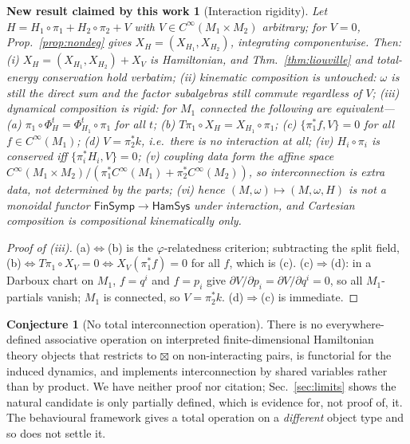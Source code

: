 \documentclass[12pt,a4paper]{article}
\theoremstyle{definition}
\newtheorem{conjecture}[definition]{Conjecture}
\theoremstyle{plain}
\theoremstyle{commentary}
\newtheorem{newresult}[definition]{New result claimed by this work}
\newcommand{\Cinf}{C^{\infty}}
\newcommand{\FinSymp}{\mathsf{FinSymp}}
\newcommand{\HamSys}{\mathsf{HamSys}}
\newcommand{\pb}[2]{\{#1,#2\}}
\begin{document}
\begin{newresult}[Interaction rigidity]\label{new:rigid}
Let $H=H_1\circ\pi_1+H_2\circ\pi_2+V$ with $V\in\Cinf(M_1\times M_2)$ arbitrary; for $V=0$,
Prop.~\ref{prop:nondeg} gives $X_H=(X_{H_1},X_{H_2})$, integrating componentwise. Then:
(i) $X_H=(X_{H_1},X_{H_2})+X_V$ is Hamiltonian, and Thm.~\ref{thm:liouville} and total-energy
conservation hold verbatim; (ii) \emph{kinematic composition is untouched}: $\omega$ is still the
direct sum and the factor subalgebras still commute \emph{regardless of $V$}; (iii) \emph{dynamical
composition is rigid}: for $M_1$ connected the following are equivalent---(a)
$\pi_1\circ\Phi^t_H=\Phi^t_{H_1}\circ\pi_1$ for all $t$; (b) $T\pi_1\circ X_H=X_{H_1}\circ\pi_1$;
(c) $\pb{\pi_1^*f}{V}=0$ for all $f\in\Cinf(M_1)$; (d) $V=\pi_2^*k$, i.e.\ \emph{there is no
interaction at all}; (iv) $H_i\circ\pi_i$ is conserved iff $\pb{\pi_i^*H_i}{V}=0$; (v) coupling data
form the affine space $\Cinf(M_1\times M_2)/(\pi_1^*\Cinf(M_1)+\pi_2^*\Cinf(M_2))$, so
\emph{interconnection is extra data, not determined by the parts}; (vi) hence
$(M,\omega)\mapsto(M,\omega,H)$ is \emph{not} a monoidal functor $\FinSymp\to\HamSys$ under
interaction, and Cartesian composition is compositional \emph{kinematically only}.
\end{newresult}
\begin{proof}[Proof of (iii)]
(a)$\Leftrightarrow$(b) is the $\varphi$-relatedness criterion; subtracting the split field,
(b)$\Leftrightarrow T\pi_1\circ X_V=0\Leftrightarrow X_V(\pi_1^*f)=0$ for all $f$, which is (c).
(c)$\Rightarrow$(d): in a Darboux chart on $M_1$, $f=q^i$ and $f=p_i$ give $\partial V/\partial
p_i=\partial V/\partial q^i=0$, so all $M_1$-partials vanish; $M_1$ is connected, so $V=\pi_2^*k$.
(d)$\Rightarrow$(c) is immediate.
\end{proof}


\begin{conjecture}[No total interconnection operation]\label{conj:interconnect}
There is no everywhere-defined associative operation on interpreted finite-dimensional Hamiltonian
theory objects that restricts to $\boxtimes$ on non-interacting pairs, is functorial for the induced
dynamics, and implements interconnection by shared variables rather than by product. We have neither
proof nor citation; Sec.~\ref{sec:limits} shows the natural candidate is only partially defined,
which is evidence for, not proof of, it. The behavioural framework \cite{Willems2007} gives a total
operation on a \emph{different} object type and so does not settle it.
\end{conjecture}
\end{document}
